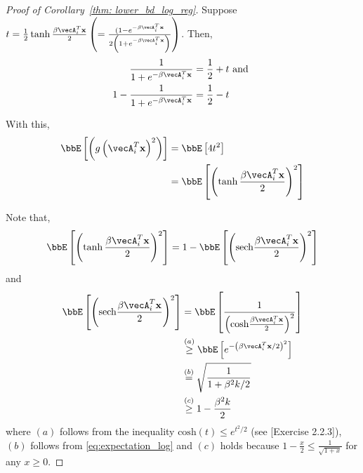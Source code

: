 \begin{proof}[Proof of Corollary~\ref{thm: lower_bd_log_reg}]
Suppose $t = \frac{1}{2}\tanh{\frac{\beta\vecA_i^T\bx}{2}} \inp{=\frac{(1-e^{-\beta \vecA_i^T\bx}}{2\inp{1+e^{-\beta \vecA_i^T\bx}}}}$. Then, 
\begin{align*}
\frac{1}{1+e^{-\beta \vecA_i^T\bx}} &= \frac{1}{2}+t\text{ and }\\
1-\frac{1}{1+e^{-\beta \vecA_i^T\bx}} &= \frac{1}{2}-t
\end{align*}

With this,
\begin{align*}
\bbE\insq{\inp{g\inp{\vecA_i^T\bx}^2}} &= \bbE\insq{4t^2}\\
& = \bbE\insq{\inp{\tanh{\frac{\beta\vecA_i^T\bx}{2}}}^2}
\end{align*}

Note that,
\begin{align*}
\bbE\insq{\inp{\tanh{\frac{\beta\vecA_i^T\bx}{2}}}^2} = 1-\bbE\insq{\inp{\text{sech}{\frac{\beta\vecA_i^T\bx}{2}}}^2}
\end{align*} and
\begin{align*}
\bbE\insq{\inp{\text{sech}{\frac{\beta\vecA_i^T\bx}{2}}}^2} &= \bbE\insq{\frac{1}{\inp{\text{cosh}{\frac{\beta\vecA_i^T\bx}{2}}}^2}}\\
&\stackrel{(a)}{\geq} \bbE\insq{e^{-\inp{\beta\vecA_i^T\bx/2}^2}}\\
&\stackrel{(b)}{=}\sqrt{\frac{1}{1+\beta^2 k/2}}\\
&\stackrel{(c)}{\geq}1-\frac{\beta^2k}{2}
\end{align*} where $(a)$ follows from the inequality $\text{cosh}(t)\leq e^{t^2/2}$ (see [Exercise 2.2.3]\cite{vershynin}),  $(b)$ follows from \eqref{eq:expectation_log} and $(c)$ holds because $1-\frac{x}{2}\leq \frac{1}{\sqrt{1+x}}$ for any $x\geq 0$.

\end{proof}
